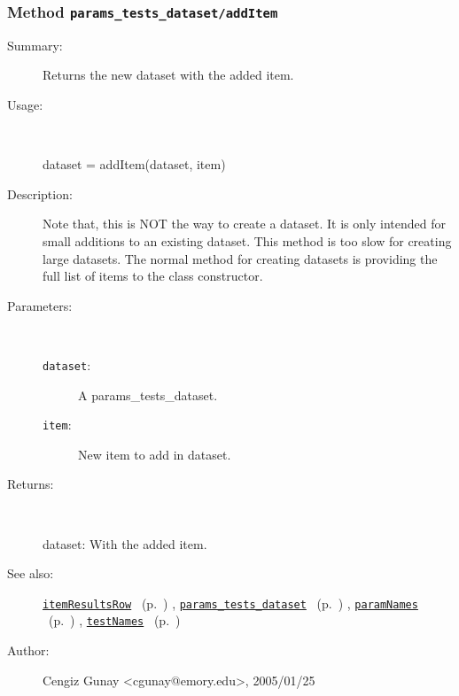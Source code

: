 \subsubsection[Method \texttt{addItem}]{Method \texttt{params\_tests\_dataset/addItem}}%
%
\label{ref_params_tests_dataset__addItem}%
\hypertarget{ref_params_tests_dataset__addItem}{}%
\begin{description}
\item[Summary:]Returns the new dataset with the added item.
%
\item[Usage:]~%
\begin{lyxcode}%
dataset = addItem(dataset, item)
%
\end{lyxcode}%
%
\item[Description:]%
Note that, this is NOT the way to create a dataset. It is only intended for 
 small additions to an existing dataset. This method is too slow
 for creating large datasets. The normal method for creating datasets is
 providing the full list of items to the class constructor.
\item[Parameters:]~
\begin{description}%
\item[\texttt{dataset}:]
 A params\_tests\_dataset.
\item[\texttt{item}:]
 New item to add in dataset.
\end{description}%
%
\item[Returns:]~

	dataset: With the added item.
%
%
\item[See also:]%
\hyperlink{ref_itemResultsRow}{\texttt{itemResultsRow}}%
\ (p.~\pageref{ref_itemResultsRow})%
%
, \hyperlink{ref_params_tests_dataset}{\texttt{params\_tests\_dataset}}%
\ (p.~\pageref{ref_params_tests_dataset})%
%
, \hyperlink{ref_paramNames}{\texttt{paramNames}}%
\ (p.~\pageref{ref_paramNames})%
%
, \hyperlink{ref_testNames}{\texttt{testNames}}%
\ (p.~\pageref{ref_testNames})%
%
%
\item[Author:]%
Cengiz Gunay <cgunay@emory.edu>, 2005/01/25%
\end{description}
\methodline%
